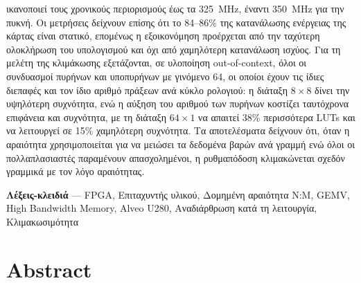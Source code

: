 \documentclass[greek, histinit, english, twosided]{book}
\begin{document}
ικανοποιεί τους χρονικούς περιορισμούς έως τα 325~MHz, έναντι 350~MHz για την πυκνή. Οι μετρήσεις δείχνουν επίσης ότι το 84--86\% της κατανάλωσης ενέργειας της κάρτας είναι στατικό, επομένως η εξοικονόμηση προέρχεται από την ταχύτερη ολοκλήρωση του υπολογισμού και όχι από χαμηλότερη κατανάλωση ισχύος. Για τη μελέτη της κλιμάκωσης εξετάζονται, σε υλοποίηση out-of-context, όλοι οι συνδυασμοί πυρήνων και υποπυρήνων με γινόμενο 64, οι οποίοι έχουν τις ίδιες διεπαφές και τον ίδιο αριθμό πράξεων ανά κύκλο ρολογιού: η διάταξη $8\times8$ δίνει την υψηλότερη συχνότητα, ενώ η αύξηση του αριθμού των πυρήνων κοστίζει ταυτόχρονα επιφάνεια και συχνότητα, με τη διάταξη $64\times1$ να απαιτεί 38\% περισσότερα LUTs και να λειτουργεί σε 15\% χαμηλότερη συχνότητα.
Τα αποτελέσματα δείχνουν ότι, όταν η αραιότητα χρησιμοποιείται για να μειώσει τα δεδομένα βαρών ανά γραμμή ενώ όλοι οι πολλαπλασιαστές παραμένουν απασχολημένοι, η ρυθμαπόδοση κλιμακώνεται σχεδόν γραμμικά με τον λόγο αραιότητας.

\textbf{Λέξεις-κλειδιά} --- FPGA, Επιταχυντής υλικού, Δομημένη αραιότητα N:M, GEMV, High Bandwidth Memory, Alveo U280, Αναδιάρθρωση κατά τη λειτουργία, Κλιμακωσιμότητα

\chapter*{Abstract}
\end{document}
